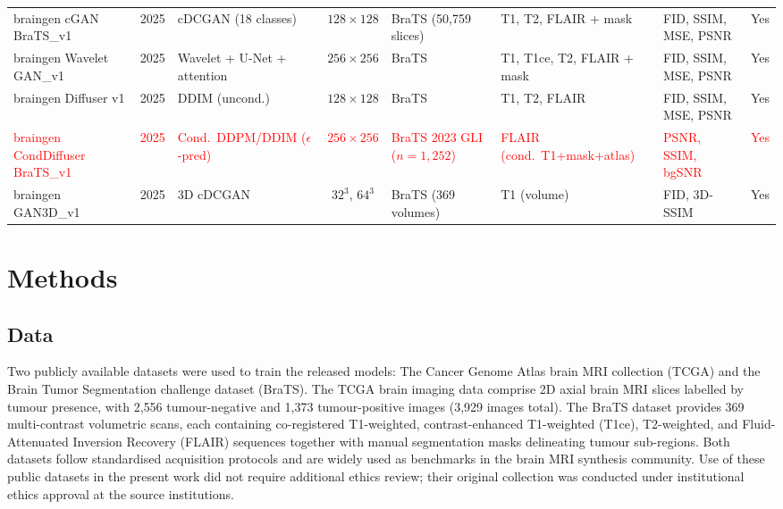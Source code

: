 \documentclass[11pt]{article}
\begin{document}
\begin{table}[!t]
\begin{tabular}{p{2.7cm}cp{2.3cm}cp{2.2cm}p{2.0cm}p{2.6cm}c}
braingen cGAN BraTS\_v1 & 2025 & cDCGAN (18 classes) & $128\!\times\!128$ & BraTS (50{,}759 slices) & T1, T2, FLAIR + mask & FID, SSIM, MSE, PSNR & Yes \\
braingen Wavelet GAN\_v1 & 2025 & Wavelet + U-Net + attention & $256\!\times\!256$ & BraTS & T1, T1ce, T2, FLAIR + mask & FID, SSIM, MSE, PSNR & Yes \\
braingen Diffuser v1 & 2025 & DDIM (uncond.) & $128\!\times\!128$ & BraTS & T1, T2, FLAIR & FID, SSIM, MSE, PSNR & Yes \\
\textcolor{red}{braingen CondDiffuser BraTS\_v1} & \textcolor{red}{2025} & \textcolor{red}{Cond.\ DDPM/DDIM ($\epsilon$-pred)} & \textcolor{red}{$256\!\times\!256$} & \textcolor{red}{BraTS 2023 GLI ($n\!=\!1{,}252$)} & \textcolor{red}{FLAIR (cond.\ T1+mask+atlas)} & \textcolor{red}{PSNR, SSIM, bgSNR} & \textcolor{red}{Yes} \\
braingen GAN3D\_v1 & 2025 & 3D cDCGAN & $32^{3}$, $64^{3}$ & BraTS (369 volumes) & T1 (volume) & FID, 3D-SSIM & Yes \\
\bottomrule
\end{tabular}
\end{table}

\section*{Methods}
\label{sec:methods}

\subsection*{Data}

Two publicly available datasets were used to train the released models: The Cancer Genome Atlas brain MRI collection (TCGA)\cite{cancergenomeatlas2013} and the Brain Tumor Segmentation challenge dataset (BraTS)\cite{bakas2017advancing,bakas2018identifying,menze2015multimodal}. The TCGA brain imaging data comprise 2D axial brain MRI slices labelled by tumour presence, with 2{,}556 tumour-negative and 1{,}373 tumour-positive images (3{,}929 images total). The BraTS dataset provides 369 multi-contrast volumetric scans, each containing co-registered T1-weighted, contrast-enhanced T1-weighted (T1ce), T2-weighted, and Fluid-Attenuated Inversion Recovery (FLAIR) sequences together with manual segmentation masks delineating tumour sub-regions. Both datasets follow standardised acquisition protocols and are widely used as benchmarks in the brain MRI synthesis community. Use of these public datasets in the present work did not require additional ethics review; their original collection was conducted under institutional ethics approval at the source institutions.
\end{document}
